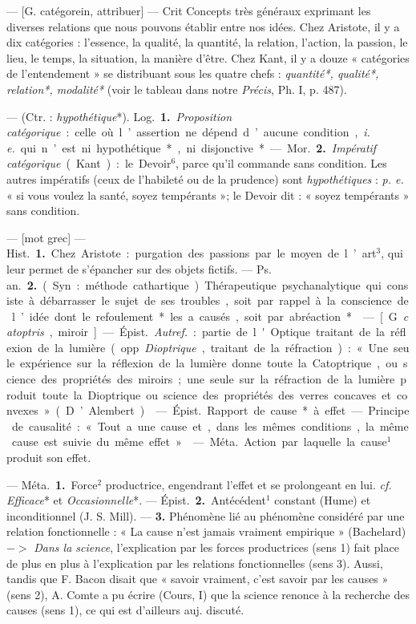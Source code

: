 \begin{itemize}[leftmargin=1cm, label=, itemsep=11pt]
 — [G. catégorein, attribuer]
— \si{Crit} Concepts très généraux
exprimant les diverses relations que
nous pouvons établir entre nos idées.
Chez Aristote, il y a dix catégories :
l'essence, la qualité, la quantité, la
relation, l’action, la passion, le lieu,
le temps, la situation, la manière
d’être. Chez Kant, il y a douze « catégories de l’entendement » se distribuant sous les quatre chefs : {\it quantité*, qualité*, relation*, modalité*}
(voir le tableau dans notre {\it Précis},
Ph. I, p. 487).

 — (Ctr. : {\it hypothétique}*).
\si{Log.} {\bf 1.} {\it Proposition catégorique} :
celle où l’assertion ne dépend d’aucune condition, {\it i. e.} qui n’est ni
hypothétique*, ni disjonctive*.

— \si{Mor.} {\bf 2.} {\it Impératif catégorique}
(Kant) : le Devoir$^6$, parce qu'il
commande sans condition. Les
autres impératifs (ceux de l’habileté
ou de la prudence) sont {\it hypothétiques} : {\it p. e.} « si vous voulez la santé,
soyez tempérants »; le Devoir dit :
« soyez tempérants » sans condition.

 — [mot grec] — \si{Hist.} {\bf 1.} Chez
Aristote : purgation des passions par
le moyen de l’art$^3$, qui leur permet
de s’épancher sur des objets fictifs.
— \si{Ps. an.} {\bf 2.} (Syn. : méthode cathartique). Thérapeutique psychanalytique qui consiste à débarrasser le
sujet de ses troubles, soit par rappel
à la conscience de l’idée dont le
refoulement* les a causés, soit par
abréaction*.

 — [G. {\it catoptris}, miroir] —
\si{Épist.} {\it Autref.} : partie de l'Optique
traitant de la réflexion de la lumière
(opp. {\it Dioptrique}, traitant de la
réfraction) : « Une seule expérience
sur la réflexion de la lumière donne
toute la Catoptrique, ou science des
propriétés des miroirs; une seule sur
la réfraction de la lumière produit...
toute la Dioptrique ou science des
propriétés des verres concaves et
convexes » (D’Alembert).

 — \si{Épist.} Rapport de cause*
à effet. — Principe de causalité :
« Tout a une cause et, dans les
mêmes conditions, la même cause
est suivie du même effet. »

 — \si{Méta.} Action par laquelle la cause$^1$ produit son effet.

 — \si{Méta.} {\bf 1.} Force$^2$ productrice,
engendrant l'effet et se prolongeant
en lui. {\it cf.} {\it Efficace}* et {\it Occasionnelle}*. — \si{Épist.} {\bf 2.} Antécédent$^1$
constant (Hume) et inconditionnel
(J. S. Mill). — {\bf 3.} Phénomène lié au
phénomène considéré par une relation fonctionnelle : « La cause n’est
jamais vraiment empirique » (Bachelard) $->$ {\it Dans la science}, l'explication par les forces productrices
(sens 1) fait place de plus en plus à
l’explication par les relations fonctionnelles (sens 3). Aussi, tandis
que F. Bacon disait que « savoir
vraiment, c’est savoir par les causes »
(sens 2), A. Comte a pu écrire
(Cours, I) que la science renonce à
la recherche des causes (sens 1), ce
qui est d'ailleurs auj. discuté.


\end{itemize}
